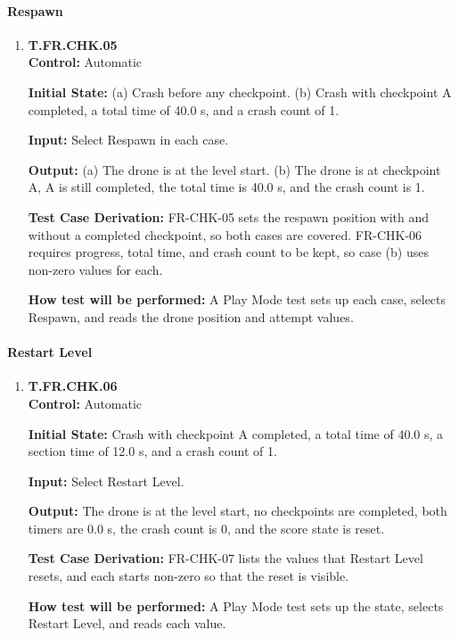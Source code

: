 \documentclass[12pt, titlepage]{article}
\begin{document}
{\paragraph{Respawn}

\begin{enumerate}

\item{\hypertarget{test-fr-chk-05}{}\textbf{T.FR.CHK.05}\\}
\textbf{Control:} Automatic

\textbf{Initial State:} (a) Crash before any checkpoint. (b) Crash with checkpoint A
completed, a total time of 40.0 s, and a crash count of 1.

\textbf{Input:} Select Respawn in each case.

\textbf{Output:} (a) The drone is at the level start. (b) The drone is at checkpoint A,
A is still completed, the total time is 40.0 s, and the crash count is 1.

\textbf{Test Case Derivation:} \mbox{FR-CHK-05} sets the respawn position with and
without a completed checkpoint, so both cases are covered. \mbox{FR-CHK-06} requires
progress, total time, and crash count to be kept, so case (b) uses non-zero values for
each.

\textbf{How test will be performed:} A Play Mode test sets up each case, selects
Respawn, and reads the drone position and attempt values.

\end{enumerate}

\paragraph{Restart Level}

\begin{enumerate}

\item{\hypertarget{test-fr-chk-06}{}\textbf{T.FR.CHK.06}\\}
\textbf{Control:} Automatic

\textbf{Initial State:} Crash with checkpoint A completed, a total time of 40.0 s, a
section time of 12.0 s, and a crash count of 1.

\textbf{Input:} Select Restart Level.

\textbf{Output:} The drone is at the level start, no checkpoints are completed, both
timers are 0.0 s, the crash count is 0, and the score state is reset.

\textbf{Test Case Derivation:} \mbox{FR-CHK-07} lists the values that Restart Level
resets, and each starts non-zero so that the reset is visible.

\textbf{How test will be performed:} A Play Mode test sets up the state, selects Restart
Level, and reads each value.

\end{enumerate}
\par}
\end{document}
